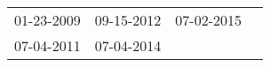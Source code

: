 \begin{supertabular}{llll}
 01-23-2009 &  09-15-2012 &  07-02-2015 \\
 07-04-2011 &  07-04-2014 &             \\
\end{supertabular}
